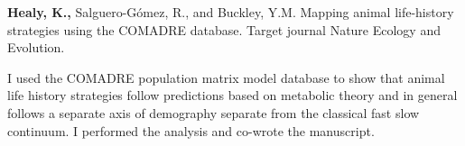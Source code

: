 \documentclass[10pt,a4paper]{article}
\begin{document}
\begin{flushleft}
\setlength{\parindent}{0mm}\textbf{Healy, K.,} Salguero-Gómez, R., and Buckley, Y.M. Mapping animal life-history strategies using the COMADRE database. Target journal Nature Ecology and Evolution.
\smallskip
\par{\fontsize{10.5}{10} I used the COMADRE population matrix model database to show that animal life history strategies follow predictions based on metabolic theory and in general follows a separate axis of demography separate from the classical fast slow continuum. I performed the analysis and co-wrote the manuscript.}

\bigskip

\end{flushleft}









\end{document}
